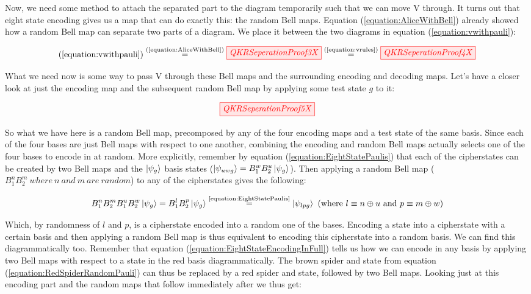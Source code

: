 \documentclass[]{article}
\newcommand{\equaltext}[1]{\ensuremath{\stackrel{\text{#1}}{=}}}
\begin{document}
Now, we need some method to attach the separated part to the diagram temporarily such that we can move V through. It turns out that eight state encoding gives us a map that can do exactly this: the random Bell maps. Equation (\ref{equation:AliceWithBell}) already showed how a random Bell map can separate two parts of a diagram. We place it between the two diagrams in equation (\ref{equation:vwithpauli}):

\begin{equation}
\label{equation:movevthrough}
(\ref{equation:vwithpauli}) \equaltext{(\ref{equation:AliceWithBell})} \tikzfig{QKRSeperationProof3X} \equaltext{(\ref{equation:vrules})} \tikzfig{QKRSeperationProof4X}
\end{equation}

What we need now is some way to pass V through these Bell maps and the surrounding encoding and decoding maps. Let's have a closer look at just the encoding map and the subsequent random Bell map by applying some test state $g$ to it:

\begin{equation}
	\label{equation:RedSpiderRandomPauli}
	\tikzfig{QKRSeperationProof5X}
\end{equation}

So what we have here is a random Bell map, precomposed by any of the four encoding maps and a test state of the same basis. Since each of the four bases are just Bell maps with respect to one another, combining the encoding and random Bell maps actually selects one of the four bases to encode in at random. More explicitly, remember by equation (\ref{equation:EightStatePaulis}) that each of the cipherstates can be created by two Bell maps and the $\ket{\psi_g}$ basis states ($\ket{\psi_{uwg}} = B_1^w B_2^u\ket{\psi_{g}}$). Then applying a random Bell map ($B_1^n B_2^m~where~n~and~m~are~random$) to any of the cipherstates gives the following:

\begin{equation}
\label{equation:EncodingInRandomCipherstate}
B_1^nB_2^mB_1^uB_2^w\ket{\psi_{g}} = B_1^lB_2^p\ket{\psi_{g}} \equaltext{\ref{equation:EightStatePaulis}} \ket{\psi_{lpg}} ~(\text{where}~ l \equiv n \oplus u ~\text{and}~ p \equiv m \oplus w)
\end{equation}

Which, by randomness of $l$ and $p$, is a cipherstate encoded into a random one of the bases. Encoding a state into a cipherstate with a certain basis and then applying a random Bell map is thus equivalent to encoding this cipherstate into a random basis. We can find this diagrammatically too. Remember that equation (\ref{equation:EightStateEncodingInFull}) tells us how we can encode in any basis by applying two Bell maps with respect to a state in the red basis diagrammatically. The brown spider and state from equation (\ref{equation:RedSpiderRandomPauli}) can thus be replaced by a red spider and state, followed by two Bell maps. Looking just at this encoding part and the random maps that follow immediately after we thus get:
\end{document}
